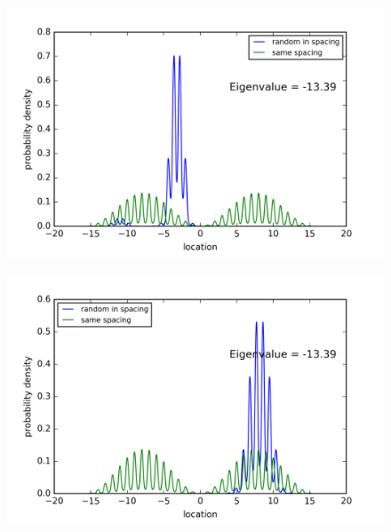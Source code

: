 \begin{figure}[!htbh]
\centering
\begin{minipage}{.45\textwidth}
  \centering
  \includegraphics[width=1.1\linewidth]{Graphics/10_0_2th_Lowest_Rand0_8.png}
  \label{fig:Area10_2thlowestRand0.8}
\end{minipage}\qquad
\begin{minipage}{.45\textwidth}
  \centering
  \includegraphics[width=1.1\linewidth]{Graphics/10_0_2th_Lowest_Rand0_9.png}
  \label{fig:Area10_2thlowestRand0.9}
\end{minipage}
\end{figure}

